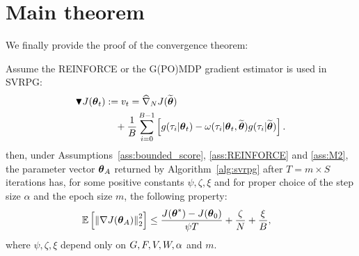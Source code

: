 \section{Main theorem}\label{sec:maintheorem}

We finally provide the proof of the convergence theorem:

\begin{theorem}\label{theo:convergence2}
	Assume the REINFORCE or the G(PO)MDP gradient estimator is used in SVRPG:
	\begin{align}
	\blacktriangledown J(\vtheta_{t}) &:= v_t= \wh{\nabla}_N J(\wt{\vtheta})\\ \notag
	& \quad{} + 
		\frac{1}{B} \sum_{i=0}^{B-1} \left[
		g(\tau_i|\vtheta_t) - \omega(\tau_i|\vtheta_t, \wt{\vtheta}) g(\tau_i|\wt{\vtheta})
		\right].
	\end{align}
	then, under Assumptions~\ref{ass:bounded_score}, \ref{ass:REINFORCE} and \ref{ass:M2}, the parameter vector $\vtheta_A$ returned by Algorithm~\ref{alg:svrpg} after $T=m\times S$ iterations has, for some positive constants $\psi,\zeta, \xi$ and for proper choice of the step size $\alpha$ and the epoch size $m$, the following property:
	\begin{align*}
	&\EVV[]
	{\norm[2]{\nabla J(\vtheta_A)}^2} 
	\leq
	\frac{J(\vtheta^*)-J(\vtheta_0)}{\psi T} +
	\frac{\zeta}{N}
	+\frac{\xi}{B},
	\end{align*}
	where $\psi,\zeta,\xi$ depend only on $\GRADLOG,\HESSLOG,\VARRF,\VARIS,\alpha$ and $m$.
\end{theorem}
